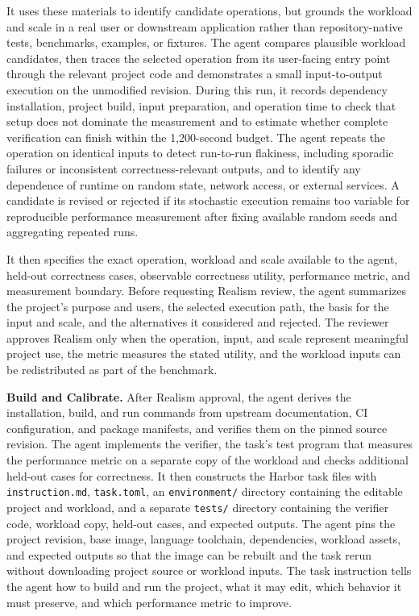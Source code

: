 It uses these materials to identify candidate operations, but grounds the workload and scale in a real user or downstream application rather than repository-native tests, benchmarks, examples, or fixtures.
The agent compares plausible workload candidates, then traces the selected operation from its user-facing entry point through the relevant project code and demonstrates a small input-to-output execution on the unmodified revision.
During this run, it records dependency installation, project build, input preparation, and operation time to check that setup does not dominate the measurement and to estimate whether complete verification can finish within the 1,200-second budget.
The agent repeats the operation on identical inputs to detect run-to-run flakiness, including sporadic failures or inconsistent correctness-relevant outputs, and to identify any dependence of runtime on random state, network access, or external services.
A candidate is revised or rejected if its stochastic execution remains too variable for reproducible performance measurement after fixing available random seeds and aggregating repeated runs.

It then specifies the exact operation, workload and scale available to the agent, held-out correctness cases, observable correctness utility, performance metric, and measurement boundary.
Before requesting Realism review, the agent summarizes the project's purpose and users, the selected execution path, the basis for the input and scale, and the alternatives it considered and rejected.
The reviewer approves Realism only when the operation, input, and scale represent meaningful project use, the metric measures the stated utility, and the workload inputs can be redistributed as part of the benchmark.

\textbf{Build and Calibrate.}
After Realism approval, the agent derives the installation, build, and run commands from upstream documentation, CI configuration, and package manifests, and verifies them on the pinned source revision.
The agent implements the verifier, the task's test program that measures the performance metric on a separate copy of the workload and checks additional held-out cases for correctness.
It then constructs the Harbor task files with \texttt{instruction.md}, \texttt{task.toml}, an \texttt{environment/} directory containing the editable project and workload, and a separate \texttt{tests/} directory containing the verifier code, workload copy, held-out cases, and expected outputs.
The agent pins the project revision, base image, language toolchain, dependencies, workload assets, and expected outputs so that the image can be rebuilt and the task rerun without downloading project source or workload inputs.
The task instruction tells the agent how to build and run the project, what it may edit, which behavior it must preserve, and which performance metric to improve.

